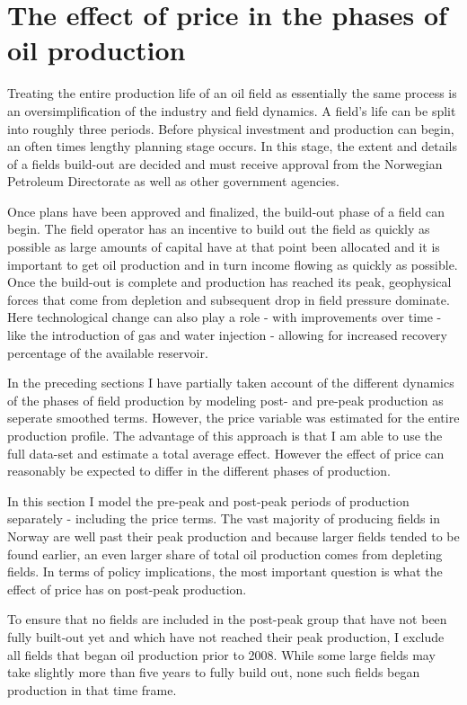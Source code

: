 \documentclass[12pt]{article}
\begin{document}
\section{The effect of price in the phases of oil production}

Treating the entire production life of an oil field as essentially the same process is an oversimplification of the industry and field dynamics.  A field's life can be split into roughly three periods.  Before physical investment and production can begin, an often times lengthy planning stage occurs.  In this stage, the extent and details of a fields build-out are decided and must receive approval from the Norwegian Petroleum Directorate as well as other government agencies.  

Once plans have been approved and finalized, the build-out phase of a field can begin.  The field operator has an incentive to build out the field as quickly as possible as large amounts of capital have at that point been allocated and it is important to get oil production and in turn income flowing as quickly as possible.  Once the build-out is complete and production has reached its peak, geophysical forces that come from depletion and subsequent drop in field pressure dominate.  Here technological change can also play a role - with improvements over time - like the introduction of gas and water injection - allowing for increased recovery percentage of the available reservoir. 

In the preceding sections I have partially taken account of the different dynamics of the phases of field production by modeling post- and pre-peak production as seperate smoothed terms.  However, the price variable was estimated for the entire production profile.  The advantage of this approach is that I am able to use the full data-set and estimate a total average effect.  However the effect of price can reasonably be expected to differ in the different phases of production.  

In this section I model the pre-peak and post-peak periods of production separately - including the price terms. The vast majority of producing fields in Norway are well past their peak production and because larger fields tended to be found earlier, an even larger share of total oil production comes from depleting fields.  In terms of policy implications, the most important question is what the effect of price has on post-peak production. 

To ensure that no fields are included in the post-peak group that have not been fully built-out yet and which have not reached their peak production, I exclude all fields that began oil production prior to 2008.  While some large fields may take slightly more than five years to fully build out, none such fields began production in that time frame.
\end{document}
